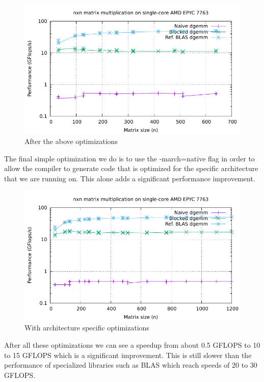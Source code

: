 \documentclass[unicode,11pt,a4paper,oneside,numbers=endperiod,openany]{scrartcl}
\begin{document}
\begin{figure}[h!]
    \centering
    \includegraphics[width=0.7\linewidth]{timing_no_march.pdf}
    \caption{After the above optimizations}
    \label{fig:image}
\end{figure}

The final simple optimization we do is to use the -march=native flag in order to allow the compiler to generate code that is optimized for the specific architecture that we are running on.
This alone adds a significant performance improvement.

\begin{figure}[h!]
    \centering
    \includegraphics[width=0.7\linewidth]{timing_all.pdf}
    \caption{With architecture specific optimizations}
    \label{fig:image}
\end{figure}

After all these optimizations we can see a speedup from about 0.5 GFLOPS to 10 to 15 GFLOPS which is a significant improvement.
This is still slower than the performance of specialized libraries such as BLAS which reach speeds of 20 to 30 GFLOPS.
\end{document}

